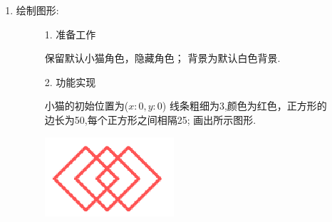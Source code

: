 \documentclass[10pt, a4paper]{article}
\begin{document}
\begin{enumerate}
        \item 绘制图形:
        \begin{figure}[htbp]
            \begin{minipage}{.6\textwidth}
                1. 准备工作
                \begin{tasks}[label = (\arabic*)]
                    \task 保留默认小猫角色，隐藏角色；
                    \task 背景为默认白色背景.
                \end{tasks}
                2. 功能实现
                \begin{tasks}[label = (\arabic*)]
                    \task 小猫的初始位置为($x:0,y:0$)
                    \task 线条粗细为3,颜色为红色，正方形的边长为50,每个正方形之间相隔25;
                    \task 画出所示图形.
                \end{tasks}
            \end{minipage}
            \begin{minipage}{.37\textwidth}
                \centering
                \includegraphics[width=.6\textwidth]{37.png}
            \end{minipage}
        \end{figure}
    \end{enumerate}
\end{document}
